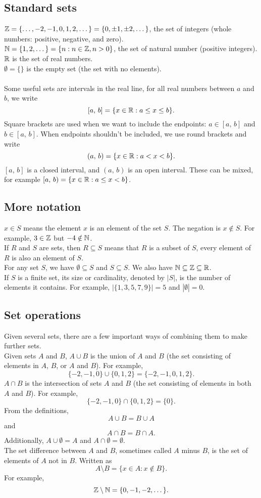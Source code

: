 \documentclass[10pt, a4paper]{article}
\begin{document}
\subsection{Standard sets}
$\mathbb{Z} = \{\dotsc, -2, -1, 0, 1, 2, \dotsc\} = \{0, \pm 1, \pm 2, \dotsc\}$, the set of integers (whole numbers: positive, negative, and zero). \\
$\mathbb{N} = \{1, 2, \dotsc\} = \{n: n \in \mathbb{Z}, n > 0\}$, the set of natural number (positive integers). \\
$\mathbb{R}$ is the set of real numbers. \\
$\emptyset = \{\}$ is the empty set (the set with no elements). \\
\\
Some useful sets are intervals in the real line, for all real numbers between $a$ and $b$, we write
\[
[a,\,b] = \{x \in \mathbb{R} : a \leq x \leq b\}.
\]
Square brackets are used when we want to include the endpoints: $a \in [a,\,b]$ and $b \in [a,\,b]$. When endpoints shouldn't be included, we use round brackets and write
\[
(a,\,b) = \{x \in \mathbb{R} : a < x < b\}.
\]
$[a,\,b]$ is a closed interval, and $(a,\,b)$ is an open interval. These can be mixed, for example $[a,\,b) = \{x \in \mathbb{R} : a \leq x < b\}$.

\subsection{More notation}
$x \in S$ means the element $x$ is an element of the set $S$. The negation is $x \notin S$. For example, $3 \in \mathbb{Z}$ but $-4 \notin \mathbb{N}$. \\
If $R$ and $S$ are sets, then $R \subseteq S$ means that $R$ is a subset of $S$, every element of $R$ is also an element of $S$. \\
For any set $S$, we have $\emptyset \subseteq S$ and $S \subseteq S$. We also have $\mathbb{N} \subseteq \mathbb{Z} \subseteq \mathbb{R}$. \\
If $S$ is a finite set, its size or cardinality, denoted by $|S|$, is the number of elements it contains. For example, $|\{1, 3, 5, 7, 9\}| = 5$ and $|\emptyset| = 0$.

\subsection{Set operations}
Given several sets, there are a few important ways of combining them to make further sets. \\
Given sets $A$ and $B$, $A \cup B$ is the union of $A$ and $B$ (the set consisting of elements in $A$, $B$, or $A$ and $B$). For example,
\[
\{-2, -1, 0\} \cup \{0, 1, 2\} = \{-2, -1, 0, 1, 2\}.
\]
$A \cap B$ is the intersection of sets $A$ and $B$ (the set consisting of elements in both $A$ and $B$). For example,
\[
\{-2, -1, 0\} \cap \{0, 1, 2\} = \{0\}.
\]
From the definitions,
\[
A \cup B = B \cup A
\]
and
\[
A \cap B = B \cap A.
\]
Additionally, $A \cup \emptyset = A$ and $A \cap \emptyset = \emptyset$. \\
The set difference between $A$ and $B$, sometimes called $A$ minus $B$, is the set of elements of $A$ not in $B$. Written as
\[
A \setminus B = \{x \in A : x \notin B\}.
\]
For example,
\[
\mathbb{Z} \setminus \mathbb{N} = \{0, -1, -2, \dotsc\}.
\]
\end{document}
